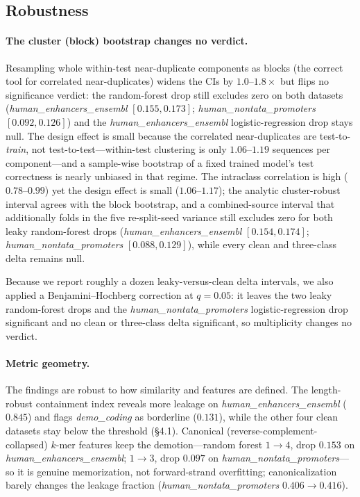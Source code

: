 \documentclass[webpdf,modern,large,namedate]{oup-authoring-template}%
\begin{document}
\subsection{Robustness}\label{sec:r-robust}
\paragraph{The cluster (block) bootstrap changes no verdict.}
Resampling whole within-test near-duplicate components as blocks (the correct tool for correlated near-duplicates) widens the CIs by $1.0$--$1.8\times$ but flips no significance verdict: the random-forest drop still excludes zero on both datasets (\textit{human\_enhancers\_ensembl} $[0.155,0.173]$; \textit{human\_nontata\_promoters} $[0.092,0.126]$) and the \textit{human\_enhancers\_ensembl} logistic-regression drop stays null. The design effect is small because the correlated near-duplicates are test-to-\emph{train}, not test-to-test---within-test clustering is only $1.06$--$1.19$ sequences per component---and a sample-wise bootstrap of a fixed trained model's test correctness is nearly unbiased in that regime. The intraclass correlation is high ($0.78$--$0.99$) yet the design effect is small ($1.06$--$1.17$); the analytic cluster-robust interval agrees with the block bootstrap, and a combined-source interval that additionally folds in the five re-split-seed variance still excludes zero for both leaky random-forest drops (\textit{human\_enhancers\_ensembl} $[0.154,0.174]$; \textit{human\_nontata\_promoters} $[0.088,0.129]$), while every clean and three-class delta remains null. 

Because we report roughly a dozen leaky-versus-clean delta intervals, we also applied a Benjamini--Hochberg correction at $q=0.05$: it leaves the two leaky random-forest drops and the \textit{human\_nontata\_promoters} logistic-regression drop significant and no clean or three-class delta significant, so multiplicity changes no verdict.

\paragraph{Metric geometry.}
The findings are robust to how similarity and features are defined. The length-robust containment index reveals more leakage on \textit{human\_enhancers\_ensembl} ($0.845$) and flags \textit{demo\_coding} as borderline ($0.131$), while the other four clean datasets stay below the threshold (\S4.1). Canonical (reverse-complement-collapsed) $k$-mer features keep the demotion---random forest $1\to4$, drop $0.153$ on \textit{human\_enhancers\_ensembl}; $1\to3$, drop $0.097$ on \textit{human\_nontata\_promoters}---so it is genuine memorization, not forward-strand overfitting; canonicalization barely changes the leakage fraction (\textit{human\_nontata\_promoters} $0.406\to0.416$). 
\end{document}
